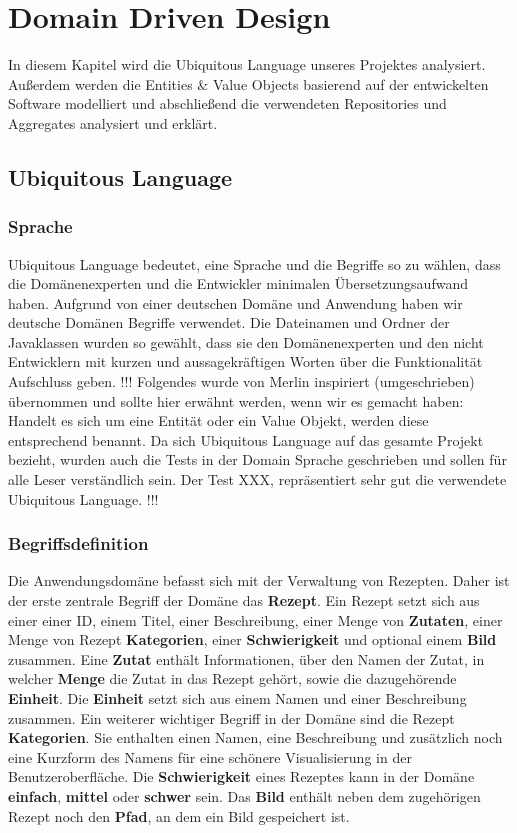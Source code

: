 \chapter{Domain Driven Design}
In diesem Kapitel wird die Ubiquitous Language unseres Projektes analysiert. Außerdem werden die Entities \& Value Objects basierend auf der entwickelten Software modelliert und abschließend die verwendeten Repositories und Aggregates analysiert und erklärt.
\section{Ubiquitous Language}
\subsection{Sprache}
Ubiquitous Language  bedeutet, eine Sprache und die Begriffe so zu wählen, dass die Domänenexperten und die Entwickler minimalen Übersetzungsaufwand haben.  Aufgrund von einer deutschen Domäne und Anwendung haben wir deutsche Domänen Begriffe verwendet.
Die Dateinamen und Ordner der Javaklassen wurden so gewählt, dass sie den Domänenexperten und den nicht Entwicklern mit kurzen und aussagekräftigen Worten über die Funktionalität Aufschluss geben. !!! Folgendes wurde von Merlin inspiriert (umgeschrieben) übernommen und sollte hier erwähnt werden, wenn wir es gemacht haben: Handelt es sich um eine Entität oder ein Value Objekt, werden diese entsprechend benannt.
Da sich Ubiquitous Language  auf das gesamte Projekt bezieht, wurden auch die Tests in der Domain Sprache geschrieben und sollen für alle Leser verständlich sein. Der Test XXX, repräsentiert sehr gut die verwendete Ubiquitous Language. !!!
\subsection{Begriffsdefinition}
Die Anwendungsdomäne befasst sich mit der Verwaltung von Rezepten. Daher ist der erste zentrale Begriff der Domäne das \textbf{Rezept}. Ein Rezept setzt sich aus einer einer ID, einem Titel, einer Beschreibung, einer Menge von \textbf{Zutaten}, einer Menge von Rezept \textbf{Kategorien}, einer \textbf{Schwierigkeit} und optional einem \textbf{Bild} zusammen. Eine \textbf{Zutat} enthält Informationen, über den Namen der Zutat, in welcher \textbf{Menge} die Zutat in das Rezept gehört, sowie die dazugehörende \textbf{Einheit}. Die \textbf{Einheit} setzt sich aus einem Namen und einer Beschreibung zusammen.
Ein weiterer wichtiger Begriff in der Domäne sind die Rezept \textbf{Kategorien}. Sie enthalten einen Namen, eine Beschreibung und zusätzlich noch eine Kurzform des Namens für eine schönere Visualisierung in der Benutzeroberfläche.
Die \textbf{Schwierigkeit} eines Rezeptes kann in der Domäne \textbf{einfach}, \textbf{mittel} oder \textbf{schwer} sein. Das \textbf{Bild} enthält neben dem zugehörigen Rezept noch den \textbf{Pfad}, an dem ein Bild gespeichert ist.

